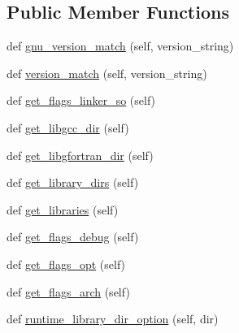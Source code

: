 \subsection*{Public Member Functions}
\begin{DoxyCompactItemize}
\item 
def \hyperlink{classnumpy_1_1distutils_1_1fcompiler_1_1gnu_1_1GnuFCompiler_af035f2687178b4d0ecb2ec9469d67a90}{gnu\+\_\+version\+\_\+match} (self, version\+\_\+string)
\item 
def \hyperlink{classnumpy_1_1distutils_1_1fcompiler_1_1gnu_1_1GnuFCompiler_aa42df87dd652bc972de4ac00927e2af4}{version\+\_\+match} (self, version\+\_\+string)
\item 
def \hyperlink{classnumpy_1_1distutils_1_1fcompiler_1_1gnu_1_1GnuFCompiler_a6543fce6fa29e83fbb68ba24ae66726c}{get\+\_\+flags\+\_\+linker\+\_\+so} (self)
\item 
def \hyperlink{classnumpy_1_1distutils_1_1fcompiler_1_1gnu_1_1GnuFCompiler_a37f3f8aaf738e3a331001024c868ce82}{get\+\_\+libgcc\+\_\+dir} (self)
\item 
def \hyperlink{classnumpy_1_1distutils_1_1fcompiler_1_1gnu_1_1GnuFCompiler_a45f83f24b9e032b69faf7831c2a0e0d8}{get\+\_\+libgfortran\+\_\+dir} (self)
\item 
def \hyperlink{classnumpy_1_1distutils_1_1fcompiler_1_1gnu_1_1GnuFCompiler_ad906f9051c46b266e4b1f734f2389439}{get\+\_\+library\+\_\+dirs} (self)
\item 
def \hyperlink{classnumpy_1_1distutils_1_1fcompiler_1_1gnu_1_1GnuFCompiler_a4960a65ee19c5ba6d590a4adf83044b0}{get\+\_\+libraries} (self)
\item 
def \hyperlink{classnumpy_1_1distutils_1_1fcompiler_1_1gnu_1_1GnuFCompiler_aea4c5970b09ee1243ef1c7a63cfa669a}{get\+\_\+flags\+\_\+debug} (self)
\item 
def \hyperlink{classnumpy_1_1distutils_1_1fcompiler_1_1gnu_1_1GnuFCompiler_a71964d48fc068a4bd5689dbe53114089}{get\+\_\+flags\+\_\+opt} (self)
\item 
def \hyperlink{classnumpy_1_1distutils_1_1fcompiler_1_1gnu_1_1GnuFCompiler_ac9e5bcbad4034c7183dc77292aab6433}{get\+\_\+flags\+\_\+arch} (self)
\item 
def \hyperlink{classnumpy_1_1distutils_1_1fcompiler_1_1gnu_1_1GnuFCompiler_a91462202c4fddba6a488919a69ec5419}{runtime\+\_\+library\+\_\+dir\+\_\+option} (self, dir)
\end{DoxyCompactItemize}
